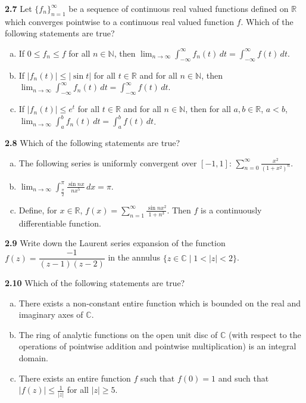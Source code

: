 \documentclass[11pt,a4paper]{article}
\newcommand{\N}{\mathbb{N}}
\newcommand{\R}{\mathbb{R}}
\newcommand{\C}{\mathbb{C}}
\newcommand{\qitem}[1]{\par\medskip\noindent\textbf{#1}\hspace{0.5em}}
\begin{document}
\qitem{2.7} Let $\{f_n\}_{n=1}^{\infty}$ be a sequence of continuous real valued functions defined on $\R$ which converges pointwise to a continuous real valued function $f$. Which of the following statements are true?
\begin{enumerate}[a.]
  \item If $0 \le f_n \le f$ for all $n \in \N$, then $\lim_{n \to \infty} \int_{-\infty}^{\infty} f_n(t)\,dt = \int_{-\infty}^{\infty} f(t)\,dt$.
  \item If $|f_n(t)| \le |\sin t|$ for all $t \in \R$ and for all $n \in \N$, then $\lim_{n \to \infty} \int_{-\infty}^{\infty} f_n(t)\,dt = \int_{-\infty}^{\infty} f(t)\,dt$.
  \item If $|f_n(t)| \le e^t$ for all $t \in \R$ and for all $n \in \N$, then for all $a, b \in \R$, $a < b$, $\lim_{n \to \infty} \int_a^b f_n(t)\,dt = \int_a^b f(t)\,dt$.
\end{enumerate}

\qitem{2.8} Which of the following statements are true?
\begin{enumerate}[a.]
  \item The following series is uniformly convergent over $[-1, 1]$: $\displaystyle\sum_{n=0}^{\infty} \frac{x^2}{(1+x^2)^n}$.
  \item $\displaystyle\lim_{n \to \infty} \int_{\frac{\pi}{2}}^{\pi} \frac{\sin nx}{nx^5}\,dx = \pi$.
  \item Define, for $x \in \R$, $f(x) = \sum_{n=1}^{\infty} \frac{\sin nx^2}{1 + n^3}$. Then $f$ is a continuously differentiable function.
\end{enumerate}

\qitem{2.9} Write down the Laurent series expansion of the function $f(z) = \dfrac{-1}{(z - 1)(z - 2)}$ in the annulus $\{z \in \C \mid 1 < |z| < 2\}$.

\qitem{2.10} Which of the following statements are true?
\begin{enumerate}[a.]
  \item There exists a non-constant entire function which is bounded on the real and imaginary axes of $\C$.
  \item The ring of analytic functions on the open unit disc of $\C$ (with respect to the operations of pointwise addition and pointwise multiplication) is an integral domain.
  \item There exists an entire function $f$ such that $f(0) = 1$ and such that $|f(z)| \le \frac{1}{|z|}$ for all $|z| \ge 5$.
\end{enumerate}
\end{document}
